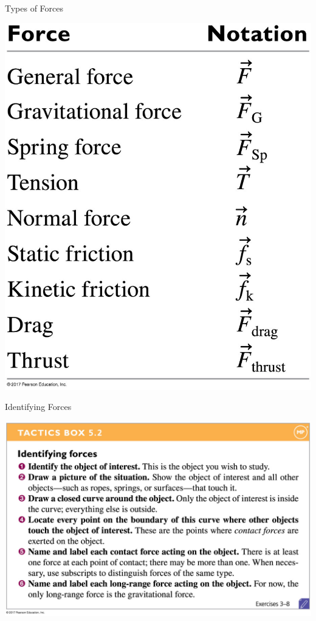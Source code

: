 \documentclass{beamer}
\begin{document}
\begin{frame}{Types of Forces}
\begin{center}
   \includegraphics[height=0.9\textheight]{../figures/05_Pg116_UnTable.jpg}
\end{center}
\end{frame}

\begin{frame}{Identifying Forces}
\begin{center}
   \includegraphics[width=\textwidth]{../figures/05_TacticsBox_02.jpg}
\end{center}
\end{frame}
\end{document}
